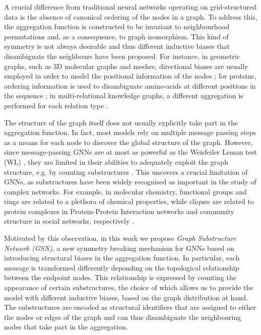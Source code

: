 \documentclass{article} \usepackage{iclr2021_conference,times}
\begin{document}
A crucial difference from traditional neural networks operating on grid-structured data is the absence of canonical ordering of the nodes in a graph. To address this, the aggregation function is constructed to be invariant to neighbourhood permutations and, as a consequence, to graph isomorphism. This kind of symmetry is not always desirable and thus different inductive biases that disambiguate the neighbours have been proposed. For instance, in geometric graphs, such as 3D molecular graphs and meshes, directional biases are usually employed in order to model the positional information of the nodes  \citep{masci2015geodesic,monti2017geometric,bouritsas2019neural,klicpera_dimenet_2020, de2020gauge}; for proteins, ordering information is used to disambiguate amino-acids at different positions in the sequence \citep{ingraham2019generative}; in multi-relational knowledge graphs, a different aggregation is performed for each relation type \citep{schlichtkrull2018modeling}. 

The structure of the graph itself does not usually explicitly take part in the aggregation function. In fact, most models rely on multiple message passing steps as a means for each node to discover the global structure of the graph. However, since message-passing GNNs are at most as powerful as the Weisfeiler Leman test (WL) \citep{xu2018how, morris2019weisfeiler}, they are limited in their abilities to adequately exploit the graph structure, e.g. by  counting  substructures \citep{DBLP:conf/fct/ArvindFKV19, chen2020can}. This uncovers a crucial limitation of GNNs, as substructures have been widely recognised as important in the study of complex networks. For example, in molecular chemistry, functional groups and rings are related to a plethora of chemical properties, while cliques are related to protein complexes in Protein-Protein Interaction networks and community structure in social networks, respectively \citep{Granovetter82thestrength, girvan2002community}. 

Motivated by this observation, in this work we propose \textit{Graph Substructure Network (GSN)}, a new symmetry breaking mechanism for GNNs based on introducing structural biases in the aggregation function. In particular, each message is transformed differently depending on the topological relationship between the endpoint nodes. This relationship is expressed by counting the appearance of certain substructures, the choice of which allows us to provide the model with different inductive biases, based on the graph distribution at hand. The substructures are encoded as structural identifiers that are assigned to either the nodes or edges of the graph and can thus disambiguate the neighbouring nodes that take part in the aggregation. 
\end{document}
